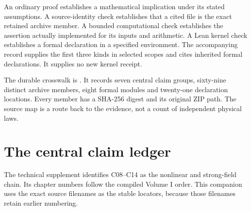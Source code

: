 An ordinary proof establishes a mathematical implication under its stated assumptions. A source-identity check establishes that a cited file is the exact retained archive member. A bounded computational check establishes the assertion actually implemented for its inputs and arithmetic. A Lean kernel check establishes a formal declaration in a specified environment. The accompanying record supplies the first three kinds in selected scopes and cites inherited formal declarations. It supplies no new kernel receipt.

The durable crosswalk is . It records seven central claim groups, sixty-nine distinct archive members, eight formal modules and twenty-one declaration locations. Every member has a SHA-256 digest and its original ZIP path. The source map is a route back to the evidence, not a count of independent physical laws.

\clearpage
\section{The central claim ledger}\label{c:verify:ledger}

The technical supplement identifies C08--C14 as the nonlinear and strong-field chain. Its chapter numbers follow the compiled Volume I order. This companion uses the exact source filenames as the stable locators, because those filenames retain earlier numbering.

